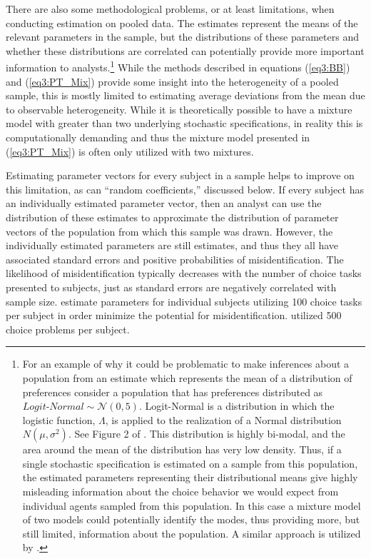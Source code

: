\documentclass[../main.tex]{subfiles}
\begin{document}
There are also some methodological problems, or at least limitations, when conducting estimation on pooled data.
The estimates represent the means of the relevant parameters in the sample, but the distributions of these parameters and whether these distributions are correlated can potentially provide more important information to analysts.\footnote{
	For an example of why it could be problematic to make inferences about a population from an estimate which represents the mean of a distribution of preferences consider a population that has preferences distributed as $\textit{Logit-Normal} \sim \mathcal{N}(0,5)$.
	Logit-Normal is a distribution in which the logistic function, $\Lambda$, is applied to the realization of a Normal distribution $N(\mu, \sigma^2)$.
	See Figure 2 of \textcite[83]{Andersen2012}.
	This distribution is highly bi-modal, and the area around the mean of the distribution has very low density.
	Thus, if a single stochastic specification is estimated on a sample from this population, the estimated parameters representing their distributional means give highly misleading information about the choice behavior we would expect from individual agents sampled from this population.
	In this case a mixture model of two models could potentially identify the modes, thus providing more, but still limited, information about the population.
	A similar approach is utilized by \textcite{Conte2011}.
}
While the methods described in equations (\ref{eq3:BB}) and (\ref{eq3:PT_Mix}) provide some insight into the heterogeneity of a pooled sample, this is mostly limited to estimating average deviations from the mean due to observable heterogeneity.
While it is theoretically possible to have a mixture model with greater than two underlying stochastic specifications, in reality this is computationally demanding and thus the mixture model presented in (\ref{eq3:PT_Mix}) is often only utilized with two mixtures.

Estimating parameter vectors for every subject in a sample helps to improve on this limitation, as can \enquote{random coefficients,} discussed below.
If every subject has an individually estimated parameter vector, then an analyst can use the distribution of these estimates to approximate the distribution of parameter vectors of the population from which this sample was drawn.
However, the individually estimated parameters are still estimates, and thus they all have associated standard errors and positive probabilities of misidentification.
The likelihood of misidentification typically decreases with the number of choice tasks presented to subjects, just as standard errors are negatively correlated with sample size.
\textcite{Hey1994} estimate parameters for individual subjects utilizing 100 choice tasks per subject in order minimize the potential for misidentification.
\textcite{Hey2001} utilized 500 choice problems per subject.
\end{document}
